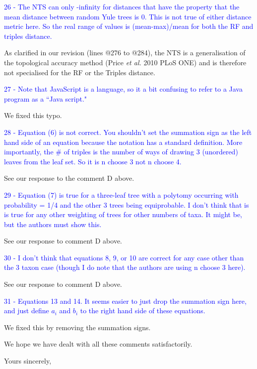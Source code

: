 \documentclass[11pt]{letter}
\begin{document}
\begin{letter}{}
\textcolor{blue}{26 - The NTS can only -infinity for distances that have the property that the mean distance between random Yule trees is 0. This is not true of either distance metric here. So the real range of values is (mean-max)/mean for both the RF and triples distance.}

As clarified in our revision (lines @276 to @284), the NTS is a generalisation of the topological accuracy method (Price \textit{et al.} 2010 PLoS ONE) and is therefore not specialised for the RF or the Triples distance.

\textcolor{blue}{27 - Note that JavaScript is a language, so it a bit confusing to refer to a Java program as a ``Java script."}

We fixed this typo.

\textcolor{blue}{28 - Equation (6) is not correct. You shouldn't set the summation sign as the left hand side of an equation because the notation has a standard definition. More importantly, the $\#$ of triples is the number of ways of drawing 3 (unordered) leaves from the leaf set. So it is n choose 3 not n choose 4.}

See our response to the comment D above.

\textcolor{blue}{29 - Equation (7) is true for a three-leaf tree with a polytomy occurring with probability = 1/4 and the other 3 trees being equiprobable. I don't think that is is true for any other weighting of trees for other numbers of taxa. It might be, but the authors must show this.}

See our response to comment D above.

\textcolor{blue}{30 - I don't think that equations 8, 9, or 10 are correct for any case other than the 3 taxon case (though I do note that the authors are using n choose 3 here).}

See our response to comment D above.

\textcolor{blue}{31 - Equations 13 and 14. It seems easier to just drop the summation sign here, and just define $a_i$ and $b_i$ to the right hand side of these equations.}

We fixed this by removing the summation signs.

\bigskip

We hope we have dealt with all these comments satisfactorily. 

\closing{Yours sincerely,}


\end{letter}
\end{document}
